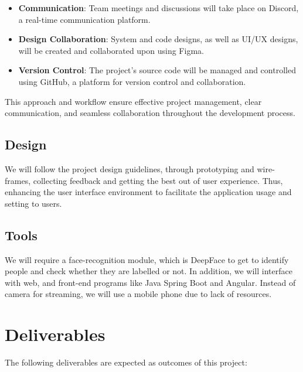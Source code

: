 \documentclass[a4 paper, 12pt]{article}
\begin{document}
\begin{itemize}
    \item \textbf{Communication}: Team meetings and discussions will take place on Discord, a real-time communication platform.

    \item \textbf{Design Collaboration}: System and code designs, as well as UI/UX designs, will be created and collaborated upon using Figma.

    \item \textbf{Version Control}: The project's source code will be managed and controlled using GitHub, a platform for version control and collaboration.
\end{itemize}

This approach and workflow ensure effective project management, clear communication, and seamless collaboration throughout the development process.

\subsection{Design}
We will follow the project design guidelines, through prototyping and wire-frames, collecting feedback and getting the best out of user experience. Thus, enhancing the user interface environment to facilitate the application usage and setting to users.
\subsection{Tools}
We will require a face-recognition module, which is DeepFace to get to identify people and check whether they are labelled or not. In addition, we will interface with web, and front-end programs like Java Spring Boot and Angular.
Instead of camera for streaming, we will use a mobile phone due to lack of resources.
\section{Deliverables}

The following deliverables are expected as outcomes of this project:
\end{document}
